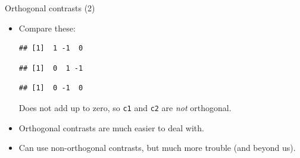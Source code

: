 \begin{frame}[fragile]{Orthogonal contrasts (2)}
  
  \begin{itemize}
\item Compare these:
\begin{knitrout}
\color{fgcolor}\begin{kframe}
\begin{alltt}
\hlkwb{=}\hlstd{(}\hlstd{,}\hlopt{-}\hlstd{,}\hlstd{)}
\end{alltt}
\begin{verbatim}
## [1]  1 -1  0
\end{verbatim}
\begin{alltt}
\hlkwb{=}\hlstd{(}\hlstd{,}\hlstd{,}\hlopt{-}\hlstd{)}
\end{alltt}
\begin{verbatim}
## [1]  0  1 -1
\end{verbatim}
\begin{alltt}
\hlopt{*}
\end{alltt}
\begin{verbatim}
## [1]  0 -1  0
\end{verbatim}
\end{kframe}
\end{knitrout}
Does not add up to zero, so \texttt{c1} and \texttt{c2} are \emph{not}
orthogonal.
\item Orthogonal contrasts are much easier to deal with. 

\item Can use non-orthogonal contrasts, but much more trouble (and
  beyond us).
  \end{itemize}
\end{frame}


